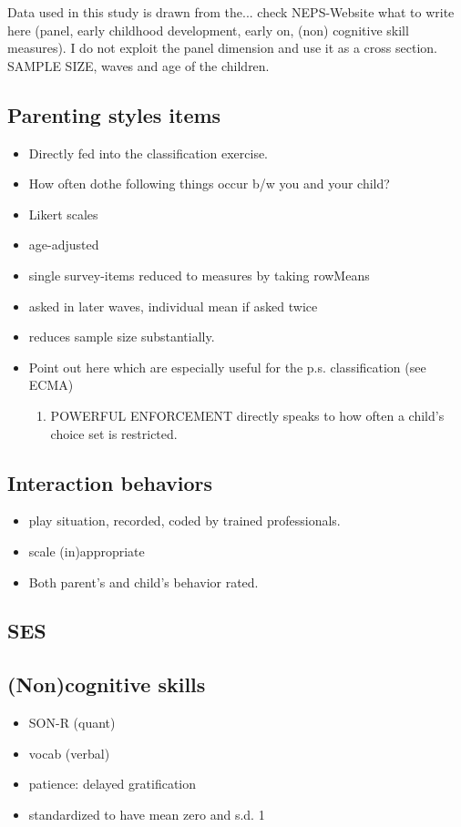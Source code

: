 Data used in this study is drawn from the... check NEPS-Website what to write here (panel, early childhood development, early on, (non) cognitive skill measures). I do not exploit the panel dimension and use it as a cross section. SAMPLE SIZE, waves and age of the children.


\subsection{Parenting styles items}
\begin{itemize}
	\item Directly fed into the classification exercise.
	\item How often dothe following things occur b/w you and your child?
	\item Likert scales
	\item age-adjusted
	\item single survey-items reduced to measures by taking rowMeans
	\item asked in later waves, individual mean if asked twice
	\item reduces sample size substantially.
	\item Point out here which are especially useful for the p.s. classification (see ECMA)
	\begin{enumerate}
		\item POWERFUL ENFORCEMENT directly speaks to how often a child's choice set is restricted.
		
	\end{enumerate}
\end{itemize}

\subsection{Interaction behaviors}
\begin{itemize}
	\item play situation, recorded, coded by trained professionals.
	\item scale (in)appropriate
	\item Both parent's and child's behavior rated.
\end{itemize}

\subsection{SES}
\subsection{(Non)cognitive skills}
\begin{itemize}
	\item SON-R (quant)
	\item vocab (verbal)
	\item patience: delayed gratification
	\item standardized to have mean zero and s.d. 1
\end{itemize}

